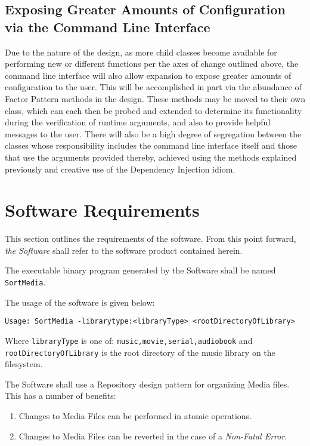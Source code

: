 \documentclass{designdoc}
\begin{document}
\subsection{Exposing Greater Amounts of Configuration via the Command Line
  Interface}
Due to the nature of the design, as more child classes become available for
performing new or different functions per the axes of change outlined above,
the command line interface will also allow expansion to expose greater amounts
of configuration to the user. This will be accomplished in part via the
abundance of Factor Pattern methods in the design. These methods may be moved
to their own class, which can each then be probed and extended to determine its
functionality during the verification of runtime arguments, and also to provide
helpful messages to the user. There will also be a high degree of segregation
between the classes whose responsibility includes the command line interface
itself and those that use the arguments provided thereby, achieved using the
methods explained previously and creative use of the Dependency Injection
idiom.

\section{Software Requirements}
This section outlines the requirements of the software. From this point
forward, \emph{the Software} shall refer to the software product contained
herein.

The executable binary program generated by the Software shall be named
\texttt{SortMedia}.

The usage of the software is given below:

\begin{verbatim}
Usage: SortMedia -librarytype:<libraryType> <rootDirectoryOfLibrary>
\end{verbatim}

Where \texttt{libraryType} is one of: \texttt{music,movie,serial,audiobook} and
\texttt{rootDirectoryOfLibrary} is the root directory of the music library on
the filesystem.

The Software shall use a Repository design pattern for organizing Media files.
This has a number of benefits:
\begin{enumerate}
\item Changes to Media Files can be performed in atomic operations.
\item Changes to Media Files can be reverted in the case of a
  \textit{Non-Fatal Error}.
\end{enumerate}
\end{document}
